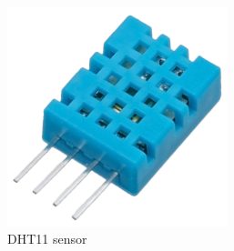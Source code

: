\documentclass[12pt, a4paper,twoside]{tesi_upf}
\begin{document}
      \begin{figure}
        \centering
        \begin{subfigure}[b]{0.3\textwidth}
                \includegraphics[width=0.7\textwidth]{./Figures/dht11.png}
                \caption{DHT11 sensor}
                \label{fig:DHT11}
        \end{subfigure}%
        ~ %
        \begin{subfigure}[b]{0.3\textwidth}

\end{subfigure}
\end{figure}
\end{document}
